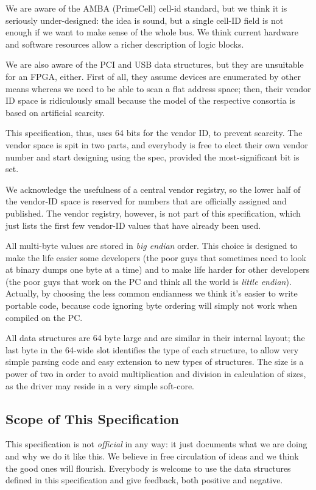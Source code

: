 \documentclass[a4paper, 12pt]{article}
\begin{document}
We are aware of the AMBA (PrimeCell) cell-id standard, but we think it
is seriously under-designed: the idea is sound, but a single cell-ID field
is not enough if we want to make sense of the whole bus. We think current
hardware and software resources allow a richer description of logic blocks.

We are also aware of the PCI and USB data structures, but they are
unsuitable for an FPGA, either. First of all, they assume devices are
enumerated by other means whereas we need to be able to scan a flat
address space; then, their vendor ID space is ridiculously small
because the model of the respective consortia is based on artificial scarcity.

This specification, thus, uses 64 bits for the vendor ID, to prevent scarcity.
The vendor space is spit in two parts, and everybody is free to elect their
own vendor number and start designing using the spec, provided the most-significant
bit is set.

We acknowledge the usefulness of a central vendor registry, so
the lower half of the
vendor-ID space is reserved for numbers that
are officially assigned and published.  The vendor registry, however, is not
part of this specification, which just lists the first few vendor-ID values that
have already been used.

All multi-byte values are stored in \textit{big endian} order.  This
choice is designed to make the life easier some developers (the poor
guys that sometimes need to look at binary dumps one byte at a time)
and to make life harder for other developers (the poor guys that work
on the PC and think all the world is \textit{little endian}).  Actually,
by choosing the less common endianness we think it's easier to write
portable code, because code ignoring byte ordering will simply not work
when compiled on the PC.

All data structures are 64 byte large and are similar in their
internal layout; the last byte in the 64-wide slot identifies the type
of each structure, to allow very simple parsing code and easy extension
to new types of structures.  The size is a power of two in order to
avoid multiplication and division in calculation of sizes, as the
driver may reside in a very simple soft-core.


\subsection{Scope of This Specification}

This specification is not \textit{official} in any way: it just
documents what we are doing and why we do it like this.  We believe
in free circulation of ideas and we think the good ones will flourish.
Everybody is welcome to use the data structures defined  in this specification
and give feedback, both positive and negative.
\end{document}
